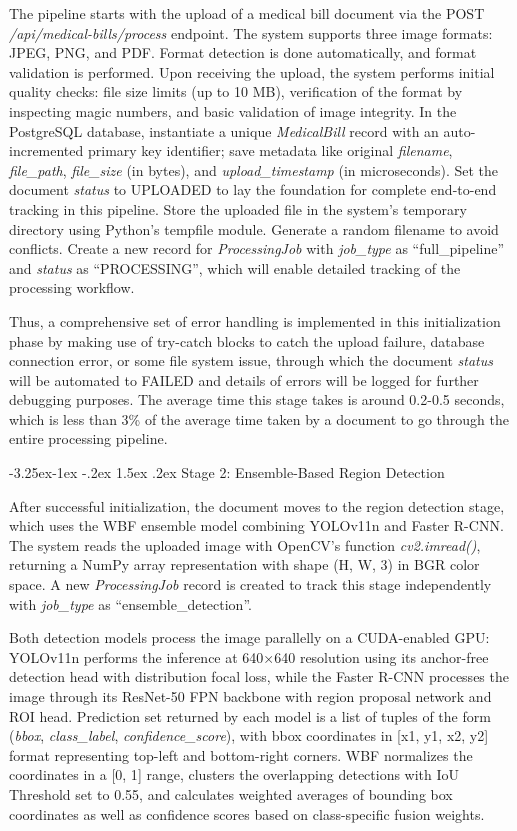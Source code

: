 \documentclass[conference,twocolumn]{IEEEtran}
\makeatletter
\renewcommand{\subsection}{\@startsection{subsection}{2}{\z@}%
  {-3.25ex\@plus -1ex \@minus -.2ex}%
  {1.5ex \@plus .2ex}%
  {\normalfont\normalsize\bfseries\itshape}}
\makeatother
\begin{document}
The pipeline starts with the upload of a medical bill document via the
POST \textit{/api/medical-bills/process} endpoint. The system supports
three image formats: JPEG, PNG, and PDF. Format detection is done
automatically, and format validation is performed. Upon receiving the
upload, the system performs initial quality checks: file size limits (up
to 10 MB), verification of the format by inspecting magic numbers, and
basic validation of image integrity. In the PostgreSQL database,
instantiate a unique \textit{MedicalBill} record with an auto-incremented
primary key identifier; save metadata like original \textit{filename},
\textit{file\_path}, \textit{file\_size} (in bytes), and
\textit{upload\_timestamp} (in microseconds). Set the document
\textit{status} to UPLOADED to lay the foundation for complete end-to-end
tracking in this pipeline. Store the uploaded file in the
system's temporary directory using
Python's tempfile module. Generate a random filename to
avoid conflicts. Create a new record for \textit{ProcessingJob} with
\textit{job\_type} as ``full\_pipeline''
and \textit{status} as ``PROCESSING'', which
will enable detailed tracking of the processing workflow.

Thus, a comprehensive set of error handling is implemented in this
initialization phase by making use of try-catch blocks to catch the
upload failure, database connection error, or some file system issue,
through which the document \textit{status} will be automated to FAILED and
details of errors will be logged for further debugging purposes. The
average time this stage takes is around 0.2-0.5 seconds, which is less
than 3\% of the average time taken by a document to go through the
entire processing pipeline.

\subsection{Stage 2: Ensemble-Based Region Detection}

After successful initialization, the document moves to the region
detection stage, which uses the WBF ensemble model combining YOLOv11n
and Faster R-CNN. The system reads the uploaded image with
OpenCV's function \textit{cv2.imread()}, returning a NumPy
array representation with shape (H, W, 3) in BGR color space. A new
\textit{ProcessingJob} record is created to track this stage independently
with \textit{job\_type} as
``ensemble\_detection''.

Both detection models process the image parallelly on a CUDA-enabled
GPU: YOLOv11n performs the inference at 640×640 resolution using its
anchor-free detection head with distribution focal loss, while the
Faster R-CNN processes the image through its ResNet-50 FPN backbone with
region proposal network and ROI head. Prediction set returned by each
model is a list of tuples of the form (\textit{bbox}, \textit{class\_label},
\textit{confidence\_score}), with bbox coordinates in {[}x1, y1, x2, y2{]}
format representing top-left and bottom-right corners. WBF normalizes
the coordinates in a {[}0, 1{]} range, clusters the overlapping
detections with IoU Threshold set to 0.55, and calculates weighted
averages of bounding box coordinates as well as confidence scores based
on class-specific fusion weights.
\end{document}
